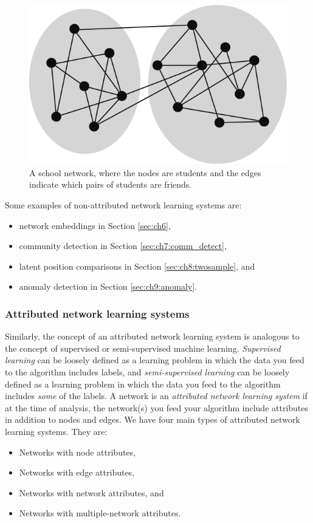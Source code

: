 \begin{figure}[h]
\centering
\includegraphics[width=0.5\linewidth]{foundations/ch1/Images/nonattr_ex.png}
\caption[School network hypothesis]{A school network, where the nodes are students and the edges indicate which pairs of students are friends.}
\label{fig:ch1:nonattr}
\end{figure}


Some examples of non-attributed network learning systems are:
\begin{itemize}
\item network embeddings in Section \ref{sec:ch6},
\item community detection in Section \ref{sec:ch7:comm_detect},
\item latent position comparisons in Section \ref{sec:ch8:twosample}, and
\item anomaly detection in Section \ref{sec:ch9:anomaly}.
\end{itemize}


\subsubsection{Attributed network learning systems}

Similarly, the concept of an attributed network learning system is analogous to the concept of supervised or semi-supervised machine learning. \textit{Supervised learning} can be loosely defined as a learning problem in which the data you feed to the algorithm includes {labels}, and \textit{semi-supervised learning} can be loosely defined as a learning problem in which the data you feed to the algorithm includes \textit{some} of the labels. A network is an \textit{attributed network learning system} if at the time of analysis, the network(s) you feed your algorithm include attributes in {addition} to nodes and edges. We have four main types of attributed network learning systems. They are:
\begin{itemize}
\item Networks with node attributes,
\item Networks with edge attributes,
\item Networks with network attributes, and
\item Networks with multiple-network attributes.
\end{itemize}


